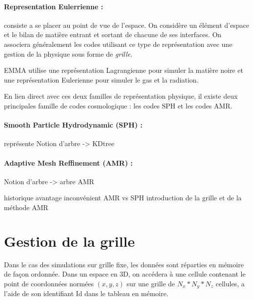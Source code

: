 \paragraph{Representation Eulerrienne : } 
consiste a se placer au point de vue de l'espace.
On considère un élément d'espace et le bilan de matière entrant et sortant de chacune de ses interfaces.
On associera généralement les codes utilisant ce type de représentation avec une gestion de la physique sous forme de \emph{grille}.

EMMA utilise une représentation Lagrangienne pour simuler la matière noire et une représentation Eulerienne pour simuler le gas et la radiation.

En lien direct avec ces deux familles de représentation physique, il existe deux principales famille de codes cosmologique : les codes \ac{SPH} et les codes \ac{AMR}.



\paragraph{Smooth Particle Hydrodynamic (SPH) : } représente 
Notion d'arbre -> KDtree

\paragraph{Adaptive Mesh Reffinement (AMR) :  }
Notion d'arbre -> arbre AMR



historique
avantage inconvénient AMR vs SPH
introduction de la grille et de la méthode AMR

\section{Gestion de la grille}

Dans le cas des simulations sur grille fixe, les données sont réparties en mémoire de façon ordonnée.
Dans un espace en 3D, on accédera à une cellule contenant le point de coordonnées normées $(x,y,z)$ sur une grille de $N_x*N_y*N_z$ cellules, a l'aide de son identifiant Id dans le tableau en mémoire.

